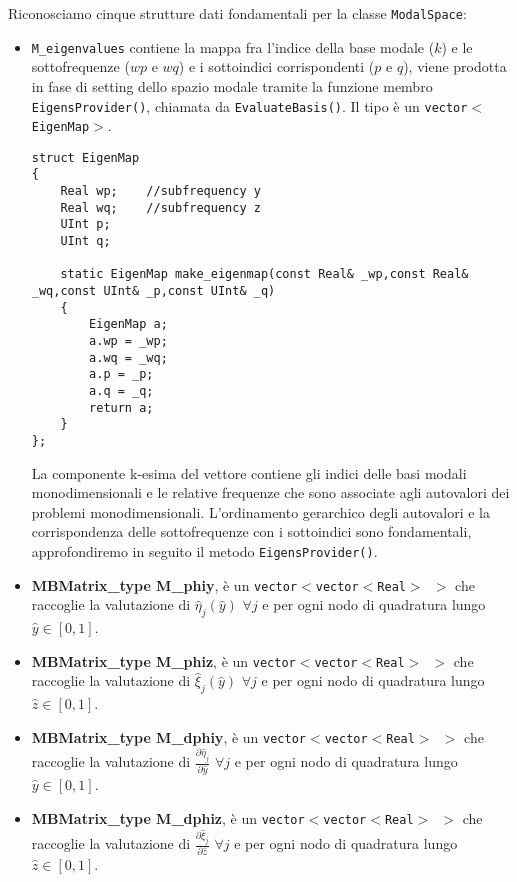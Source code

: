 Riconosciamo cinque strutture dati fondamentali per la classe \texttt{ModalSpace}:

\begin{itemize}

\item \texttt{M\_eigenvalues} contiene la mappa fra l'indice della base modale ($k$) e le sottofrequenze ($wp$ e $wq$) e i sottoindici corrispondenti ($p$ e $q$), viene prodotta in fase di setting dello 
spazio modale tramite la funzione membro \texttt{EigensProvider()}, chiamata da \texttt{EvaluateBasis()}. Il tipo \`e un \texttt{vector$<
$EigenMap$>$}.
 
\begin{lstlisting}[style = general]
struct EigenMap
{
	Real wp;	//subfrequency y
	Real wq;	//subfrequency z
	UInt p;
	UInt q;
	
	static EigenMap make_eigenmap(const Real& _wp,const Real& _wq,const UInt& _p,const UInt& _q)
	{
		EigenMap a;
		a.wp = _wp;
		a.wq = _wq;
		a.p = _p;
		a.q = _q;
		return a;	
	}
};
\end{lstlisting}
La componente k-esima del vettore contiene gli indici delle basi modali monodimensionali e le relative frequenze che sono associate agli autovalori
dei problemi monodimensionali.
L'ordinamento gerarchico degli autovalori e la corrispondenza delle sottofrequenze con i sottoindici sono fondamentali, approfondiremo in seguito 
il metodo \texttt{EigensProvider()}.

\item \textbf{MBMatrix\_type M\_phiy}, \`e un \texttt{vector$<$vector$<$Real$>$ $>$} che raccoglie la valutazione di $\hat{\eta}_j(\hat{y})$ $\forall j$ e per ogni nodo di quadratura lungo $\hat{y}\in[0,1]$.

\item \textbf{MBMatrix\_type M\_phiz}, \`e un \texttt{vector$<$vector$<$Real$>$ $>$} che raccoglie la valutazione di $\hat{\xi}_j(\hat{y})$ $\forall j$ e per ogni nodo di quadratura lungo $\hat{z}\in[0,1]$.

\item \textbf{MBMatrix\_type M\_dphiy}, \`e un \texttt{vector$<$vector$<$Real$>$ $>$} che raccoglie la valutazione di $\frac{\partial\hat{\eta}_j}{\partial 	\hat{y}}$ $\forall j$ e per ogni nodo di quadratura lungo $\hat{y}\in[0,1]$.

\item \textbf{MBMatrix\_type M\_dphiz}, \`e un \texttt{vector$<$vector$<$Real$>$ $>$} che raccoglie la valutazione di $\frac{\partial\hat{\xi}_j}{\partial 	\hat{z}}$ $\forall j$ e per ogni nodo di quadratura lungo $\hat{z}\in[0,1]$.

\end{itemize}
